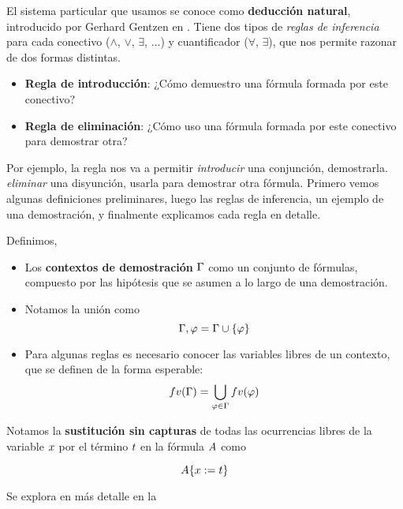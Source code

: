 El sistema particular que usamos se conoce como \textbf{deducción natural},
introducido por Gerhard Gentzen en \cite{gentzen-1935}. Tiene dos tipos de
\textit{reglas de inferencia} para cada conectivo ($\wedge$, $\vee$, $\exists$,
$\dots$) y cuantificador ($\forall$, $\exists$), que nos permite razonar de dos formas distintas.

\begin{itemize}
    \item \textbf{Regla de introducción}: ¿Cómo demuestro una fórmula formada por este conectivo?
    \item \textbf{Regla de eliminación}: ¿Cómo uso una fórmula formada por este conectivo para demostrar otra?
\end{itemize}

Por ejemplo, la regla  nos va a permitir \textit{introducir} una conjunción, demostrarla.  \textit{eliminar} una disyunción, usarla para demostrar otra fórmula. Primero vemos algunas definiciones preliminares, luego las reglas de inferencia, un ejemplo de una demostración, y finalmente explicamos cada regla en detalle.

\begin{definition}
    \label{nd:def:ctx}
    Definimos,
    \begin{itemize}
        \item Los \textbf{contextos de demostración} $\Gamma$ como un conjunto de fórmulas, compuesto por las hipótesis que se asumen a lo largo de una demostración.
        \item Notamos la unión como
        \[
            \Gamma, \varphi = \Gamma \cup \{\varphi\}
        \]
        \item Para algunas reglas es necesario conocer las variables libres de un contexto, que se definen de la forma esperable:
        \[
            fv(\Gamma) = \bigcup_{\varphi \in \Gamma} fv(\varphi)
        \]
    \end{itemize}
\end{definition}

\begin{definition}[Sustitución]
    Notamos la \textbf{sustitución sin capturas} de todas las ocurrencias libres de la variable $x$ por el término $t$ en la fórmula $A$ como

    \[
        A \{x := t\}
    \]

    Se explora en más detalle en la 
\end{definition}

